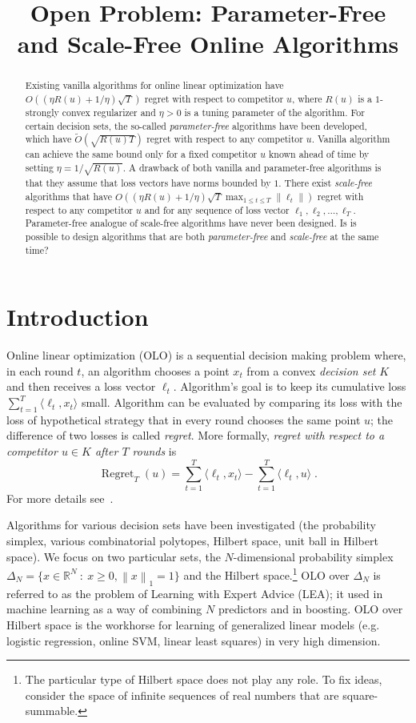 \documentclass{colt2016} %
\title{Open Problem: Parameter-Free and Scale-Free Online Algorithms}
\DeclareMathOperator{\Regret}{Regret}
\newcommand{\R}{\mathbb{R}}     %
\newcommand{\norm}[1]{\left\|{#1}\right\|}
\begin{document}
\maketitle

\begin{abstract}
Existing vanilla algorithms for online linear optimization have
$O((\eta R(u) + 1/\eta) \sqrt{T})$ regret with respect to competitor $u$,
where $R(u)$ is a $1$-strongly convex regularizer and $\eta > 0$ is a
tuning parameter of the algorithm. For certain decision sets, the
so-called \emph{parameter-free} algorithms have been developed, which have
$\widetilde O(\sqrt{R(u) T})$ regret with respect to any competitor $u$.
Vanilla algorithm can achieve the same bound only for a fixed competitor
$u$ known ahead of time by setting $\eta = 1/\sqrt{R(u)}$. A drawback of
both vanilla and parameter-free algorithms is that they assume that loss vectors
have norms bounded by $1$. There exist \emph{scale-free} algorithms that have
$O((\eta R(u) + 1/\eta) \sqrt{T} \max_{1 \le t \le T} \norm{\ell_t})$
regret with respect to any competitor $u$ and for any sequence of loss
vector $\ell_1, \ell_2, \dots, \ell_T$. Parameter-free analogue of scale-free
algorithms have never been designed. Is is possible to design algorithms that
are both \emph{parameter-free} and \emph{scale-free} at the same time?
\end{abstract}

\section{Introduction}

Online linear optimization (OLO) is a sequential decision making problem where,
in each round $t$, an algorithm chooses a point $x_t$ from a convex
\emph{decision set} $K$ and then receives a loss vector $\ell_t$. Algorithm's
goal is to keep its cumulative loss $\sum_{t=1}^T \langle \ell_t, x_t \rangle$
small. Algorithm can be evaluated by comparing its loss with the loss of
hypothetical strategy that in every round chooses the same point $u$; the
difference of two losses is called \emph{regret}. More formally, \emph{regret
with respect to a competitor $u \in K$ after $T$ rounds} is
$$
\Regret_T(u) = \sum_{t=1}^T \langle \ell_t, x_t \rangle - \sum_{t=1}^T \langle \ell_t, u \rangle \; .
$$
For more details see~\cite{Cesa-Bianchi-Lugosi-2006, Shalev-Shwartz-2011}.

Algorithms for various decision sets have been investigated (the probability
simplex, various combinatorial polytopes, Hilbert space, unit ball in Hilbert
space). We focus on two particular sets, the $N$-dimensional probability
simplex $\Delta_N = \{ x \in \R^N ~:~ x \ge 0, \norm{x}_1 = 1\}$ and the
Hilbert space.\footnote{The particular type of Hilbert space does not play any
role. To fix ideas, consider the space of infinite sequences of real numbers
that are square-summable.} OLO over $\Delta_N$ is referred to as the problem of
Learning with Expert Advice (LEA); it used in machine learning as a way of
combining $N$ predictors and in boosting. OLO over Hilbert space is the
workhorse for learning of generalized linear models (e.g. logistic
regression, online SVM, linear least squares) in very high dimension.
\end{document}
